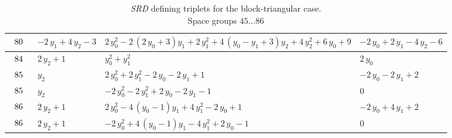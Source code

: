 \begin{table}[H]
\begin{center}
{\begin{tabular}{|l|l|l|l|}
$\begin{tabular}{l}
80 \\
\end{tabular}$ & $ -2 \, y_{1} + 4 \, y_{2} - 3 $ & $ 2 \, y_{0}^{2} - 2 \, {\left(2 \, y_{0} + 3\right)} y_{1} + 2 \, y_{1}^{2} + 4 \, {\left(y_{0} - y_{1} + 3\right)} y_{2} + 4 \, y_{2}^{2} + 6 \, y_{0} + 9 $ & $ -2 \, y_{0} + 2 \, y_{1} - 4 \, y_{2} - 6 $ \\ \hline
$\begin{tabular}{l}
84 \\
\end{tabular}$ & $ 2 \, y_{2} + 1 $ & $ y_{0}^{2} + y_{1}^{2} $ & $ 2 \, y_{0} $ \\ \hline
$\begin{tabular}{l}
85 \\
\end{tabular}$ & $ y_{2} $ & $ 2 \, y_{0}^{2} + 2 \, y_{1}^{2} - 2 \, y_{0} - 2 \, y_{1} + 1 $ & $ -2 \, y_{0} - 2 \, y_{1} + 2 $ \\ \hline
$\begin{tabular}{l}
85 \\
\end{tabular}$ & $ y_{2} $ & $ -2 \, y_{0}^{2} - 2 \, y_{1}^{2} + 2 \, y_{0} - 2 \, y_{1} - 1 $ & $ 0 $ \\ \hline
$\begin{tabular}{l}
86 \\
\end{tabular}$ & $ 2 \, y_{2} + 1 $ & $ 2 \, y_{0}^{2} - 4 \, {\left(y_{0} - 1\right)} y_{1} + 4 \, y_{1}^{2} - 2 \, y_{0} + 1 $ & $ -2 \, y_{0} + 4 \, y_{1} + 2 $ \\ \hline
$\begin{tabular}{l}
86 \\
\end{tabular}$ & $ 2 \, y_{2} + 1 $ & $ -2 \, y_{0}^{2} + 4 \, {\left(y_{0} - 1\right)} y_{1} - 4 \, y_{1}^{2} + 2 \, y_{0} - 1 $ & $ 0 $ \\ \hline
\end{tabular}
}
\captionsetup{justification=centering}
\caption{\textit{SRD} defining triplets for the block-triangular case. \\ Space groups $45 \dots86 $}
\label{tab:case1_srdegrees54}
\end{center}
\end{table}

\newpage

